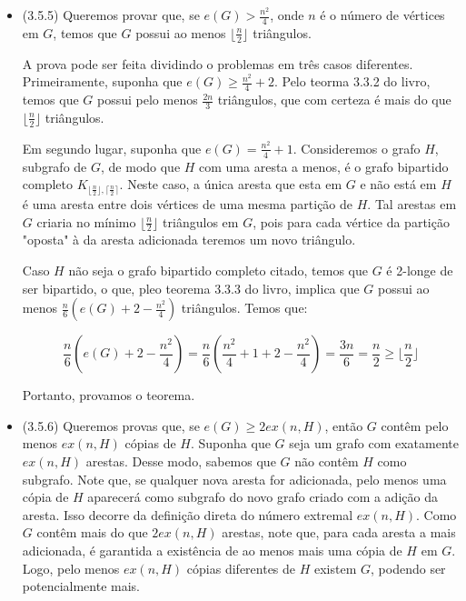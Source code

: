 \documentclass{article}
\begin{document}
\begin{enumerate}
\begin{itemize}
		            Seja agora \(H = G - K_k\). Pela hipótese, \(|E(H)| \leq (1 - \frac{1}{n})\frac{n^2}{2}\).
		            Logo temos que \(|E(G)| \leq (1 - \frac{1}{n})\frac{n^2}{2} + (n-k)(k-1) + \binom{n}{2}\),
		            como queríamos demonstrar.

		      \item (3.5.5)
		            Queremos provar que, se \(e(G) > \frac{n^2}{4}\), onde \(n\) é o número de vértices em \(G\),
		            temos que \(G\) possui ao menos \(\lfloor\frac{n}{2}\rfloor\) triângulos.


		            A prova pode ser feita dividindo o problemas em três casos diferentes. Primeiramente, suponha
		            que \(e(G) \geq \frac{n^2}{4} + 2\). Pelo teorma 3.3.2 do livro, temos que \(G\) possui pelo menos
		            \(\frac{2n}{3}\) triângulos, que com certeza é mais do que \(\lfloor\frac{n}{2}\rfloor\) triângulos.

		            Em segundo lugar, suponha que \(e(G) = \frac{n^2}{4} + 1\). Consideremos o grafo \(H\), subgrafo de \(G\), de modo que
		            \(H\) com uma aresta a menos, é o grafo bipartido completo \(K_{{\lfloor\frac{n}{2}\rfloor}, {\lceil\frac{n}{2}}\rceil}\).
		            Neste caso, a única aresta que esta em \(G\) e não está em \(H\) é uma aresta entre dois vértices de uma mesma
		            partição de \(H\). Tal arestas em \(G\) criaria no mínimo \(\lfloor\frac{n}{2}\rfloor\) triângulos em \(G\), pois para
		            cada vértice da partição "oposta" à da aresta adicionada teremos um novo triângulo.

		            Caso \(H\) não seja o grafo bipartido completo citado, temos que \(G\) é 2-longe de ser bipartido, o que, pleo teorema
		            3.3.3 do livro, implica que \(G\) possui ao menos \(\frac{n}{6}(e(G) + 2 - \frac{n^2}{4})\) triângulos. Temos que:

		            \[\frac{n}{6}(e(G) + 2 - \frac{n^2}{4}) = \frac{n}{6}(\frac{n^2}{4} + 1 + 2 - \frac{n^2}{4}) = \frac{3n}{6} = \frac{n}{2} \geq \lfloor\frac{n}{2}\rfloor\]

		            Portanto, provamos o teorema.


		      \item (3.5.6)
		            Queremos provas que, se \(e(G) \geq 2 ex(n, H)\), então \(G\) contêm pelo menos \(ex(n, H)\) cópias de \(H\).
		            Suponha que \(G\) seja um grafo com exatamente \(ex(n, H)\) arestas. Desse modo, sabemos que \(G\) não contêm \(H\) como subgrafo.
		            Note que, se qualquer nova aresta for adicionada, pelo menos uma cópia de \(H\) aparecerá como subgrafo do novo grafo criado com a adição da aresta.
		            Isso decorre da definição direta do número extremal \(ex(n, H)\). Como \(G\) contêm mais do que \(2 ex(n, H)\) arestas, note que, para cada aresta a mais adicionada, é garantida a existência
		            de ao menos mais uma cópia de \(H\) em \(G\). Logo, pelo menos \(ex(n, H)\) cópias diferentes de \(H\) existem \(G\), podendo ser potencialmente mais.


\end{itemize}
\end{enumerate}
\end{document}
